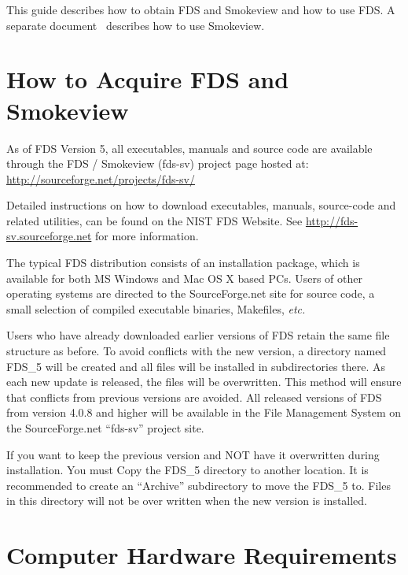 \documentclass[11pt]{book}
\begin{document}
This guide describes how to obtain FDS and Smokeview and how to use FDS.
A separate document~\cite{Smokeview_Users_Guide_5} describes how to use Smokeview.

\section{How to Acquire FDS and Smokeview}
\label{info:sfcvs}

As of FDS Version 5, all executables, manuals and source code are available through the
FDS / Smokeview (fds-sv) project page  hosted at:
\href{http://sourceforge.net/projects/fds-sv/}{{\ct http://sourceforge.net/projects/fds-sv/}}

Detailed instructions on how to download executables, manuals, source-code and related utilities,
can be found on the NIST FDS Website.
See \href{http://fds-sv.sourceforge.net}{{\ct http://fds-sv.sourceforge.net}} for more information.

The typical FDS distribution consists of an installation package, which is available
for both MS Windows and Mac OS X based PCs.  Users of other operating systems are directed to the
SourceForge.net site for source code, a small selection of compiled executable binaries, Makefiles,
{\em etc.}

Users who have already downloaded earlier versions of FDS retain the same file structure as before.
To avoid conflicts with the new version, a directory named FDS\_5 will be created and all files will be
installed in subdirectories there.  As each new update is released, the files will be overwritten.  This
method will ensure that conflicts from previous versions are avoided.  All released versions of FDS
from version 4.0.8 and higher will be available in the File Management System on the SourceForge.net
``fds-sv'' project site.

\begin{warning}
\noindent
If you want to keep the previous version and NOT have it overwritten during installation.
You must Copy the FDS\_5 directory to another location.  It is recommended to create an ``Archive'' subdirectory
to move the FDS\_5 to.  Files in this directory will not be over written when the new version is installed.
\end{warning}

\section{Computer Hardware Requirements}
\end{document}
